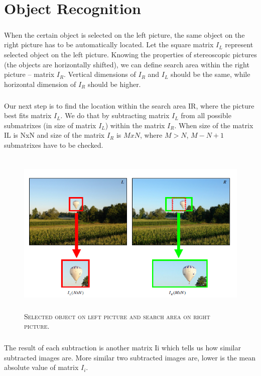\chapter{Object Recognition}
\paragraph{} When the certain object is selected on the left picture, the same object on the right picture has to be automatically located. Let the square matrix $I_{L}$ represent selected object on the left picture. Knowing the properties of stereoscopic pictures (the objects are horizontally shifted), we can define search area within the right picture – matrix $I_{R}$.
Vertical dimensions of $I_{R}$ and $I_{L}$ should be the same, while horizontal dimension of $I_{R}$ should be higher.

\paragraph{}Our next step is to find the location within the search area IR, where the picture best fits matrix $I_{L}$. We do that by subtracting matrix $I_{L}$ from all possible submatrixes (in size of matrix $I_{L}$) within the matrix $I_{R}$. When size of the matrix IL is NxN and size of the matrix $I_{R}$ is $MxN$, where $M>N$, $M-N+1$ submatrixes have to be checked.

\begin{figure}[H]
	\centering
	\includegraphics[height= 8cm, width= 14cm]{project/images/y.png}
	\caption{\textsc{Selected object on left picture and search area on right picture.}}
\end{figure}
\paragraph{}The result of each subtraction is another matrix Ii which tells us how similar subtracted images are. More similar two subtracted images are, lower is the mean absolute value of matrix $I_{i}$.\\
